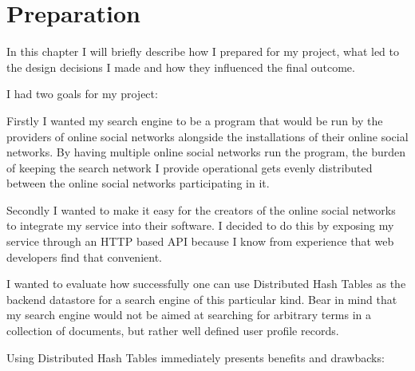 

\section{Preparation}


In this chapter I will briefly describe how I prepared for my project, what led to the design decisions I made and how they influenced the final outcome.

\mbox{} %


I had two goals for my project:

Firstly I wanted my search engine to be a program that would be run by the providers of online social networks alongside the installations of their online social networks.
By having multiple online social networks run the program, the burden of keeping the search network I provide operational gets evenly distributed between the online social networks participating in it. 

Secondly I wanted to make it easy for the creators of the online social networks to integrate my service into their software.
I decided to do this by exposing my service through an HTTP based API because I know from experience that web developers find that convenient. 

% 

I wanted to evaluate how successfully one can use Distributed Hash Tables as the backend datastore for a search engine of this particular kind. Bear in mind that my search engine would not be aimed at searching for arbitrary terms in a collection of documents, but rather well defined user profile records. 

Using Distributed Hash Tables immediately presents benefits and drawbacks: 

